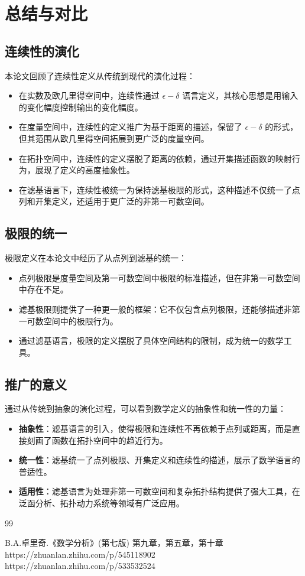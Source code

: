 \documentclass[a4paper, oneside]{article}
\begin{document}
\section{总结与对比}

\subsection{连续性的演化}

本论文回顾了连续性定义从传统到现代的演化过程：
\begin{itemize}
    \item 在实数及欧几里得空间中，连续性通过 $\epsilon-\delta$ 语言定义，其核心思想是用输入的变化幅度控制输出的变化幅度。
    \item 在度量空间中，连续性的定义推广为基于距离的描述，保留了 $\epsilon-\delta$ 的形式，但其范围从欧几里得空间拓展到更广泛的度量空间。
    \item 在拓扑空间中，连续性的定义摆脱了距离的依赖，通过开集描述函数的映射行为，展现了定义的高度抽象性。
    \item 在滤基语言下，连续性被统一为保持滤基极限的形式，这种描述不仅统一了点列和开集定义，还适用于更广泛的非第一可数空间。
\end{itemize}

\subsection{极限的统一}

极限定义在本论文中经历了从点列到滤基的统一：
\begin{itemize}
    \item 点列极限是度量空间及第一可数空间中极限的标准描述，但在非第一可数空间中存在不足。
    \item 滤基极限则提供了一种更一般的框架：它不仅包含点列极限，还能够描述非第一可数空间中的极限行为。
    \item 通过滤基语言，极限的定义摆脱了具体空间结构的限制，成为统一的数学工具。
\end{itemize}

\subsection{推广的意义}

通过从传统到抽象的演化过程，可以看到数学定义的抽象性和统一性的力量：
\begin{itemize}
    \item \textbf{抽象性}：滤基语言的引入，使得极限和连续性不再依赖于点列或距离，而是直接刻画了函数在拓扑空间中的趋近行为。
    \item \textbf{统一性}：滤基统一了点列极限、开集定义和连续性的描述，展示了数学语言的普适性。
    \item \textbf{适用性}：滤基语言为处理非第一可数空间和复杂拓扑结构提供了强大工具，在泛函分析、拓扑动力系统等领域有广泛应用。
\end{itemize}

\begin{thebibliography}{99} 
    
    B.A.卓里奇.《数学分析》(第七版) 第九章，第五章，第十章
    https://zhuanlan.zhihu.com/p/545118902
    https://zhuanlan.zhihu.com/p/533532524
\end{thebibliography}
\end{document}
